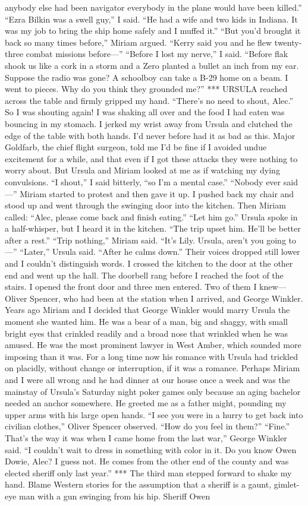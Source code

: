\documentclass{novel}
\begin{document}
anybody else had been navigator everybody in the plane would have been killed.” “Ezra Bilkin was a swell guy,” I said. “He had a wife and two kids in Indiana. It was my job to bring the ship home safely and I muffed it.” “But you’d brought it back so many times before,” Miriam argued. “Kerry said you and he flew twenty-three combat missions before—” “Before I lost my nerve,” I said. “Before flak shook us like a cork in a storm and a Zero planted a bullet an inch from my ear. Suppose the radio was gone? A schoolboy can take a B-29 home on a beam. I went to pieces. Why do you think they grounded me?” *** URSULA reached across the table and firmly gripped my hand. “There’s no need to shout, Alec.” So I was shouting again! I was shaking all over and the food I had eaten was bouncing in my stomach. I jerked my wrist away from Ursula and clutched the edge of the table with both hands. I’d never before had it as bad as this. Major Goldfarb, the chief flight surgeon, told me I’d be fine if I avoided undue excitement for a while, and that even if I got these attacks they were nothing to worry about. But Ursula and Miriam looked at me as if watching my dying convulsions. “I shout,” I said bitterly, “so I’m a mental case.” “Nobody ever said—” Miriam started to protest and then gave it up. I pushed back my chair and stood up and went through the swinging door into the kitchen. Then Miriam called: “Alec, please come back and finish eating.” “Let him go.” Ursula spoke in a half-whisper, but I heard it in the kitchen. “The trip upset him. He’ll be better after a rest.” “Trip nothing,” Miriam said. “It’s Lily. Ursula, aren’t you going to—” “Later,” Ursula said. “After he calms down.” Their voices dropped still lower and I couldn’t distinguish words. I crossed the kitchen to the door at the other end and went up the hall. The doorbell rang before I reached the foot of the stairs. I opened the front door and three men entered. Two of them I knew—Oliver Spencer, who had been at the station when I arrived, and George Winkler. Years ago Miriam and I decided that George Winkler would marry Ursula the moment she wanted him. He was a bear of a man, big and shaggy, with small bright eyes that crinkled readily and a broad nose that wrinkled when he was amused. He was the most prominent lawyer in West Amber, which sounded more imposing than it was. For a long time now his romance with Ursula had trickled on placidly, without change or interruption, if it was a romance. Perhaps Miriam and I were all wrong and he had dinner at our house once a week and was the mainstay of Ursula’s Saturday night poker games only because an aging bachelor needed an anchor somewhere. He greeted me as a father might, pounding my upper arms with his large open hands. “I see you were in a hurry to get back into civilian clothes,” Oliver Spencer observed. “How do you feel in them?” “Fine.” That’s the way it was when I came home from the last war,” George Winkler said. “I couldn’t wait to dress in something with color in it. Do you know Owen Dowie, Alec? I guess not. He comes from the other end of the county and was elected sheriff only last year.” *** The third man stepped forward to shake my hand. Blame Western stories for the assumption that a sheriff is a gaunt, gimlet-eye man with a gun swinging from his hip. Sheriff Owen 
\end{document}
